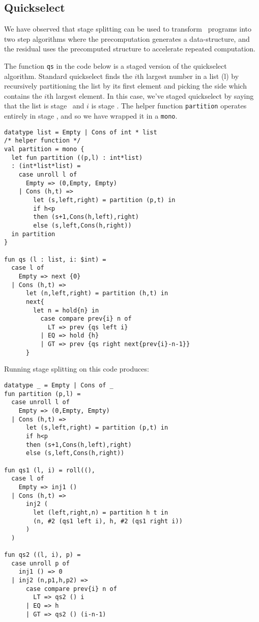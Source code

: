 \subsection{Quickselect}

We have observed that stage splitting can be used to transform \lang\ programs into two step algorithms where the precomputation generates a data-structure, and the residual uses the precomputed structure to accelerate repeated computation.  

The function {\tt qs} in the code below is a staged version of the quickselect algorithm.
Standard quickselect finds the $i$th largest number in a list (l) by recursively partitioning the list by its 
first element and picking the side which contains the $i$th largest element.
In this case, we've staged quickselect by saying that the list is stage \bbone\ and $i$ is stage \bbtwo.
The helper function {\tt partition} operates entirely in stage \bbone, and so we have wrapped it in a \texttt{mono}.

\begin{lstlisting} 
datatype list = Empty | Cons of int * list
/* helper function */
val partition = mono {
  let fun partition ((p,l) : int*list) 
  : (int*list*list) =
    case unroll l of 
      Empty => (0,Empty, Empty) 
    | Cons (h,t) =>
        let (s,left,right) = partition (p,t) in
        if h<p 
        then (s+1,Cons(h,left),right)
        else (s,left,Cons(h,right))
  in partition
}

fun qs (l : list, i: $int) = 
  case l of
    Empty => next {0}
  | Cons (h,t) => 
      let (n,left,right) = partition (h,t) in
      next{
        let n = hold{n} in
          case compare prev{i} n of
            LT => prev {qs left i}
          | EQ => hold {h}
          | GT => prev {qs right next{prev{i}-n-1}}
      }	
\end{lstlisting}

\noindent
Running stage splitting on this code produces:

\begin{lstlisting} 
datatype _ = Empty | Cons of _
fun partition (p,l) =
  case unroll l of 
    Empty => (0,Empty, Empty) 
  | Cons (h,t) =>
      let (s,left,right) = partition (p,t) in
      if h<p 
      then (s+1,Cons(h,left),right)
      else (s,left,Cons(h,right))

fun qs1 (l, i) = roll((), 
  case l of
    Empty => inj1 ()
  | Cons (h,t) => 
      inj2 (
        let (left,right,n) = partition h t in
        (n, #2 (qs1 left i), h, #2 (qs1 right i))
      )
  )

fun qs2 ((l, i), p) = 
  case unroll p of
    inj1 () => 0
  | inj2 (n,p1,h,p2) => 
      case compare prev{i} n of
        LT => qs2 () i
      | EQ => h
      | GT => qs2 () (i-n-1)
\end{lstlisting}

